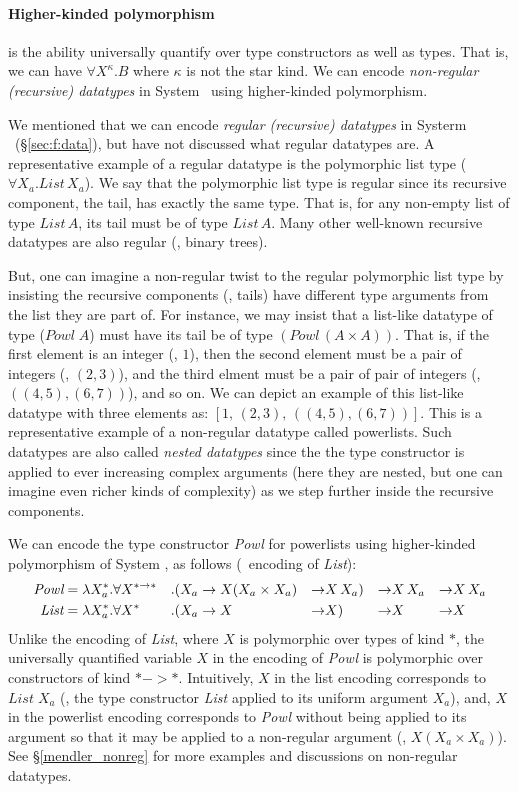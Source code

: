 \paragraph{Higher-kinded polymorphism} is the ability universally quantify
over type constructors as well as types. That is, we can have
$\forall X^\kappa.B$ where $\kappa$ is not the star kind.
We can encode \emph{non-regular (recursive) datatypes} in System \Fw\ using
higher-kinded polymorphism.

We mentioned that we can encode \emph{regular (recursive) datatypes}
in Systerm \F\ (\S\ref{sec:f:data}), but have not discussed
what regular datatypes are. A representative example of a regular datatype
is the polymorphic list type ($\forall X_a.\textit{List}\,X_a$).
We say that the polymorphic list type is regular since its recursive
component, the tail, has exactly the same type. That is, for any
non-empty list of type $\textit{List}\,A$, its tail must be of type $\textit{List}\,A$.
Many other well-known recursive datatypes are also regular (\eg, binary trees).

But, one can imagine a non-regular twist to the regular polymorphic list type
by insisting the recursive components (\ie, tails) have different
type arguments from the list they are part of. For instance, we may insist
that a list-like datatype of type ($\textit{Powl}\;A$) must have its tail be
of type $(\textit{Powl}\,(A\times A))$. That is, if the first element is
an integer (\eg, $1$), then the second element must be a pair of integers
(\eg, $(2,3)$), and the third elment must be a pair of pair of integers
(\eg, $((4,5),(6,7))$), and so on. We can depict an example of this list-like
datatype with three elements as: $[1,\,(2,3),\,((4,5),(6,7))]$.
This is a representative example of a non-regular datatype called powerlists.
Such datatypes are also called \emph{nested datatypes} %
since the the type constructor is applied to ever increasing complex arguments
(here they are nested, but one can imagine even richer kinds of complexity)
as we step further inside the recursive components.

We can encode the type constructor \textit{Powl} for powerlists using
higher-kinded polymorphism of System \Fw, as follows
(\cf\ encoding of \textit{List}):
\begin{align*}
\textit{Powl} &= \lambda X_a^{*}.\forall X^{* -> *}&.&
        (X_a -> X(X_a\times X_a) & -> & X\,X_a) & -> & X\,X_a & -> & X\,X_a \\
\textit{List} &= \lambda X_a^{*}.\forall X^{*}&.&
        (X_a -> X & -> & X) & -> & X & -> & X
\end{align*}
Unlike the encoding of \textit{List}, where $X$ is polymorphic over types
of kind $*$, the universally quantified variable $X$ in the encoding of
\textit{Powl} is polymorphic over constructors of kind $* -> *$.
Intuitively, $X$ in the list encoding corresponds to $\textit{List}\;X_a$
(\ie, the type constructor \textit{List} applied to its uniform argument $X_a$),
and, $X$ in the powerlist encoding corresponds to \textit{Powl} without
being applied to its argument so that it may be applied to a non-regular
argument (\eg, $X(X_a\times X_a)$). See \S\ref{mendler_nonreg} for more
examples and discussions on non-regular datatypes.

